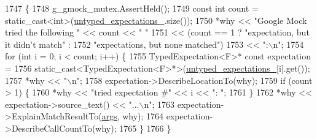 \begin{DoxyCode}
1747                                                         \{
1748     g\_gmock\_mutex.AssertHeld();
1749     \textcolor{keyword}{const} \textcolor{keywordtype}{int} count = \textcolor{keyword}{static\_cast<}\textcolor{keywordtype}{int}\textcolor{keyword}{>}(\hyperlink{classtesting_1_1internal_1_1UntypedFunctionMockerBase_aae4a42a4bace1fcb0cd4bdf1ddd40277}{untyped\_expectations\_}.size());
1750     *why << \textcolor{stringliteral}{"Google Mock tried the following "} << count << \textcolor{stringliteral}{" "}
1751          << (count == 1 ? \textcolor{stringliteral}{"expectation, but it didn't match"} :
1752              \textcolor{stringliteral}{"expectations, but none matched"})
1753          << \textcolor{stringliteral}{":\(\backslash\)n"};
1754     \textcolor{keywordflow}{for} (\textcolor{keywordtype}{int} i = 0; i < count; i++) \{
1755       TypedExpectation<F>* \textcolor{keyword}{const} expectation =
1756           \textcolor{keyword}{static\_cast<}TypedExpectation<F>*\textcolor{keyword}{>}(\hyperlink{classtesting_1_1internal_1_1UntypedFunctionMockerBase_aae4a42a4bace1fcb0cd4bdf1ddd40277}{untyped\_expectations\_}[i].get());
1757       *why << \textcolor{stringliteral}{"\(\backslash\)n"};
1758       expectation->DescribeLocationTo(why);
1759       \textcolor{keywordflow}{if} (count > 1) \{
1760         *why << \textcolor{stringliteral}{"tried expectation #"} << i << \textcolor{stringliteral}{": "};
1761       \}
1762       *why << expectation->source\_text() << \textcolor{stringliteral}{"...\(\backslash\)n"};
1763       expectation->ExplainMatchResultTo(\hyperlink{namespacegenerate__debs_a75f9143e38df82d83b2e8a6f99cae02c}{args}, why);
1764       expectation->DescribeCallCountTo(why);
1765     \}
1766   \}
\end{DoxyCode}
\mbox{\label{classtesting_1_1internal_1_1FunctionMockerBase_a9f701bc2048925f61cab0491a9aa275c}} 
